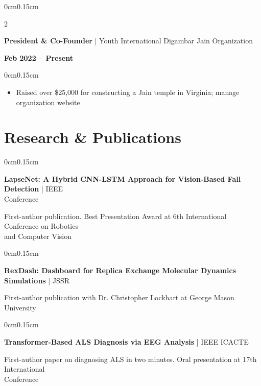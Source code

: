 \documentclass[10pt, letterpaper]{article}
\newenvironment{highlights}{
    \begin{itemize}[topsep=0pt, parsep=0pt, partopsep=0pt, itemsep=0pt, leftmargin=0.4cm]
}{
    \end{itemize}
}
\newenvironment{onecolentry}{
    \begin{adjustwidth}{0cm}{0.15cm}
}{
    \end{adjustwidth}
}
\newenvironment{twocolentry}[2][]{
    \onecolentry
    \def\secondColumn{#2}
    \setcolumnwidth{\fill, 4cm}
    \begin{paracol}{2}
}{
    \switchcolumn \raggedleft \secondColumn
    \end{paracol}
    \endonecolentry
}
\begin{document}
    \vspace{0.1cm}

    \begin{twocolentry}{\textbf{Feb 2022 -- Present}}
        \textbf{President \& Co-Founder} | Youth International Digambar Jain Organization
    \end{twocolentry}

    \vspace{0.05cm}
    \begin{onecolentry}
        \begin{highlights}
            \item Raised over \$25,000 for constructing a Jain temple in Virginia; manage organization website
        \end{highlights}
    \end{onecolentry}

    \section{Research \& Publications}
    \vspace{0.05cm}

    \begin{onecolentry}
        \textbf{LapseNet: A Hybrid CNN-LSTM Approach for Vision-Based Fall Detection} | IEEE\\Conference
        
        \vspace{0.05cm}
        First-author publication. Best Presentation Award at 6th International Conference on Robotics\\and Computer Vision
    \end{onecolentry}

    \vspace{0.1cm}

    \begin{onecolentry}
        \textbf{RexDash: Dashboard for Replica Exchange Molecular Dynamics Simulations} | JSSR
        
        \vspace{0.05cm}
        First-author publication with Dr. Christopher Lockhart at George Mason University
    \end{onecolentry}

    \vspace{0.1cm}

    \begin{onecolentry}
        \textbf{Transformer-Based ALS Diagnosis via EEG Analysis} | IEEE ICACTE
        
        \vspace{0.05cm}
        First-author paper on diagnosing ALS in two minutes. Oral presentation at 17th International\\Conference
    \end{onecolentry}
\end{document}

